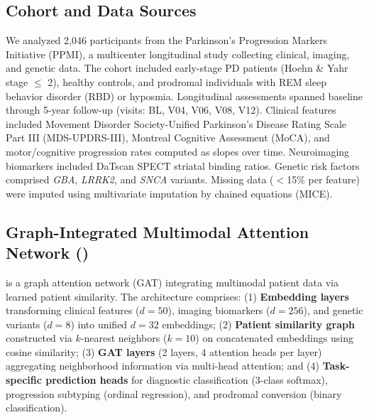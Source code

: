 \subsection{Cohort and Data Sources}

We analyzed 2,046 participants from the Parkinson's Progression Markers Initiative (PPMI)\cite{marek2011ppmi}, a multicenter longitudinal study collecting clinical, imaging, and genetic data. The cohort included early-stage PD patients (Hoehn \& Yahr stage $\leq$ 2), healthy controls, and prodromal individuals with REM sleep behavior disorder (RBD) or hyposmia. Longitudinal assessments spanned baseline through 5-year follow-up (visits: BL, V04, V06, V08, V12). Clinical features included Movement Disorder Society-Unified Parkinson's Disease Rating Scale Part III (MDS-UPDRS-III), Montreal Cognitive Assessment (MoCA), and motor/cognitive progression rates computed as slopes over time\cite{fahn1987updrs,nasreddine2005moca}. Neuroimaging biomarkers included DaTscan SPECT striatal binding ratios. Genetic risk factors comprised \textit{GBA}, \textit{LRRK2}, and \textit{SNCA} variants\cite{nalls2019identification}. Missing data ($<$15\% per feature) were imputed using multivariate imputation by chained equations (MICE)\cite{buuren2011mice}.

\subsection{Graph-Integrated Multimodal Attention Network (\giman)}

\giman{} is a graph attention network (GAT)\cite{veličković2018graph} integrating multimodal patient data via learned patient similarity. The architecture comprises: (1) \textbf{Embedding layers} transforming clinical features ($d=50$), imaging biomarkers ($d=256$), and genetic variants ($d=8$) into unified $d=32$ embeddings; (2) \textbf{Patient similarity graph} constructed via $k$-nearest neighbors ($k=10$) on concatenated embeddings using cosine similarity; (3) \textbf{GAT layers} (2 layers, 4 attention heads per layer) aggregating neighborhood information via multi-head attention\cite{veličković2018graph}; and (4) \textbf{Task-specific prediction heads} for diagnostic classification (3-class softmax), progression subtyping (ordinal regression), and prodromal conversion (binary classification).

